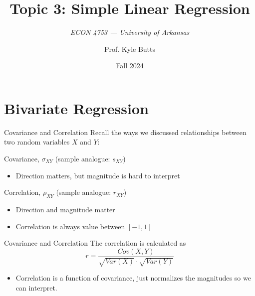 \documentclass[aspectratio=169,t,11pt,table]{beamer}
\title{Topic 3: Simple Linear Regression}
\subtitle{\it  ECON 4753 — University of Arkansas}
\date{Fall 2024}
\author{Prof. Kyle Butts}
\begin{document}
\begin{frame}
\maketitle

\end{frame}

\section{Bivariate Regression}

\begin{frame}{Covariance and Correlation}
  Recall the ways we discussed relationships between two random variables $X$ and $Y$:

  \bigskip
  Covariance, $\sigma_{XY}$ (sample analogue: $s_{XY}$)
        
  \begin{itemize}
    \item Direction matters, but magnitude is hard to interpret
  \end{itemize}
        
  \bigskip
  Correlation, $\rho_{XY}$ (sample analogue: $r_{XY}$)
  
  \begin{itemize}
    \item Direction and magnitude matter
    
    \item Correlation is always value between $[-1, 1]$
  \end{itemize}
\end{frame}

\begin{frame}{Covariance and Correlation}
  The \alert{correlation} is calculated as
  \begin{equation}\label{eq:correlation}
    r = \frac{Cov(X, Y)}{\sqrt{Var(X)} \cdot \sqrt{Var(Y)}}
  \end{equation}

  \begin{itemize}
    \item Correlation is a function of covariance, just normalizes the magnitudes so we can interpret.
  \end{itemize}
\end{frame}
\end{document}
